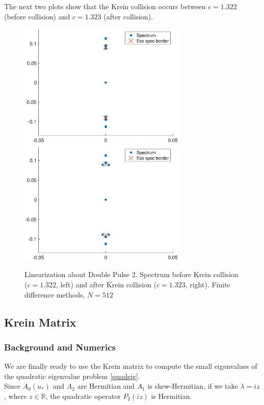 \documentclass[12pt]{article}
\def\R{{\mathbb R}}
\begin{document}
The next two plots show that the Krein collision occurs between $c = 1.322$ (before collision) and $c = 1.323$ (after collision).

\begin{figure}[H]
\centering
\includegraphics[width=8cm]{spec1322_double2.eps}
\includegraphics[width=8cm]{spec1323_double2.eps}
\caption{Linearization about Double Pulse 2. Spectrum before Krein collision ($c = 1.322$, left) and after Krein collision ($c = 1.323$, right). Finite difference methods, $N = 512$}
\end{figure}

\subsection{Krein Matrix}

\subsubsection{Background and Numerics}

We are finally ready to use the Krein matrix to compute the small eigenvalues of the quadratic eigenvalue problem \eqref{quadeig}.\\

Since $A_0(u_*)$ and $A_2$ are Hermitian and $A_1$ is skew-Hermitian, if we take $\lambda = i z$, where $z \in \R$, the quadratic operator $P_2(iz)$ is Hermitian.\\
\end{document}
